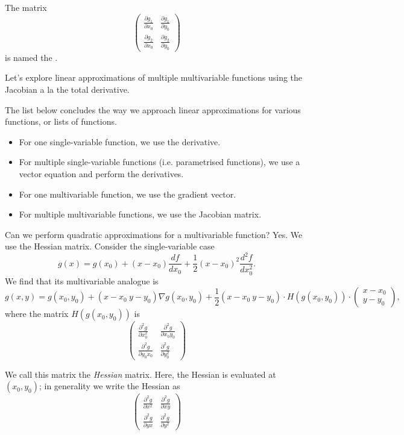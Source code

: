 \documentclass[a4paper, 12pt,oneside,openany]{book}
\begin{document}
The matrix $$\begin{pmatrix} \frac{\partial g_1}{\partial x_0} & \frac{\partial g_1}{\partial y_0} \\ \frac{\partial g_2}{\partial x_0} & \frac{\partial g_2}{\partial y_0}\end{pmatrix}$$ is named the . 


Let's explore linear approximations of multiple multivariable functions using the Jacobian a la the total derivative.

The list below concludes the way we approach linear approximations for various functions, or lists of functions.

\begin{itemize}
	\item For one single-variable function, we use the derivative.
	\item For multiple single-variable functions (i.e. parametrised functions), we use a vector equation and perform the derivatives.
	\item For one multivariable function, we use the gradient vector.
	\item For multiple multivariable functions, we use the Jacobian matrix.
\end{itemize}

Can we perform quadratic approximations for a multivariable function? Yes. We use the Hessian matrix. Consider the single-variable case $$g(x) = g(x_0) + (x-x_0) \frac{df}{dx_0} + \frac{1}{2} (x-x_0)^2 \frac{d^2f}{dx_0^2}.$$ We find that its multivariable analogue is $$g(x, y) = g(x_0, y_0) + (x-x_0 \ y-y_0) \nabla g(x_0, y_0) + \frac{1}{2} (x-x_0 \ y-y_0) \cdot H(g(x_0, y_0)) \cdot \begin{pmatrix} x-x_0 \\ y-y_0 \end{pmatrix},$$ where the matrix $H(g(x_0, y_0))$ is $$\begin{pmatrix} \frac{\partial^2 g}{\partial x_0^2} & \frac{\partial^2 g}{\partial x_0y_0} \\ \frac{\partial^2 g}{\partial y_0x_0} & \frac{\partial^2 g}{\partial y_0^2}\end{pmatrix}$$

We call this matrix the \emph{Hessian} matrix. Here, the Hessian is evaluated at $(x_0, y_0)$; in generality we write the Hessian as $$\begin{pmatrix} \frac{\partial^2 g}{\partial x^2} & \frac{\partial^2 g}{\partial xy} \\ \frac{\partial^2 g}{\partial yx} & \frac{\partial^2 g}{\partial y^2}\end{pmatrix}$$
\end{document}
